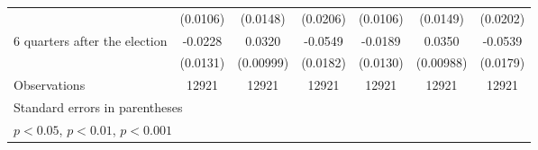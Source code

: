 \begin{table}[htbp]
\begin{tabular}{l*{6}{c}}
                    &    (0.0106)         &    (0.0148)         &    (0.0206)         &    (0.0106)         &    (0.0149)         &    (0.0202)         \\
[1em]
 6 quarters after the election&     -0.0228         &      0.0320\sym{**} &     -0.0549\sym{**} &     -0.0189         &      0.0350\sym{***}&     -0.0539\sym{**} \\
                    &    (0.0131)         &   (0.00999)         &    (0.0182)         &    (0.0130)         &   (0.00988)         &    (0.0179)         \\
\hline
Observations        &       12921         &       12921         &       12921         &       12921         &       12921         &       12921         \\
\hline\hline
\multicolumn{7}{l}{\footnotesize Standard errors in parentheses}\\
\multicolumn{7}{l}{\footnotesize \sym{*} \(p<0.05\), \sym{**} \(p<0.01\), \sym{***} \(p<0.001\)}\\
\end{tabular}
\end{table}
